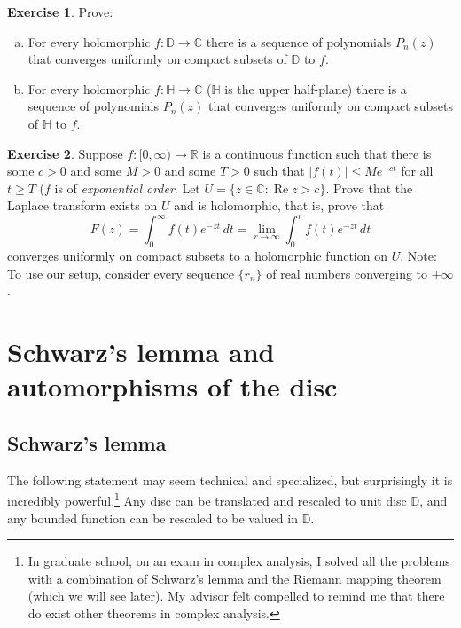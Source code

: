 \documentclass[12pt,openany]{book}
\renewcommand{\Re}{\operatorname{Re}}
\newcommand{\sabs}[1]{\lvert {#1} \rvert}
\newcommand{\C}{{\mathbb{C}}}
\newcommand{\R}{{\mathbb{R}}}
\newcommand{\D}{{\mathbb{D}}}
\newcommand{\bH}{{\mathbb{H}}}
\newcommand{\myindex}[1]{#1\index{#1}}
\theoremstyle{plain}
\theoremstyle{remark}
\theoremstyle{definition}
\newenvironment{exbox}{%
    \def\FrameCommand{\vrule width 1pt \relax\hspace{10pt}}%
    \MakeFramed{\advance\hsize-\width\FrameRestore}%
}{%
    \endMakeFramed
}
\newenvironment{exparts}{%
    \leavevmode\begin{enumerate}[a),noitemsep,topsep=0pt,parsep=0pt,partopsep=0pt]
}{%
    \end{enumerate}
}
\theoremstyle{exercise}
\newtheorem{exercise}{Exercise}[section]
\theoremstyle{example}
\begin{document}
\begin{exbox}
\begin{exercise}\label{exercise:polylimits}
\pagebreak[2]
Prove:
\begin{exparts}
\item
For every holomorphic $f \colon \D \to \C$ there
is a sequence of polynomials $P_n(z)$ that converges uniformly on compact
subsets of $\D$ to $f$.
\item
For every holomorphic $f \colon \bH \to \C$
($\bH$ is the upper half-plane) there
is a sequence of polynomials $P_n(z)$ that converges uniformly on compact
subsets of $\bH$ to $f$.
\end{exparts}
\end{exercise}

\begin{exercise}
\pagebreak[2]
Suppose $f \colon [0,\infty) \to \R$ is a continuous function such that
there is some $c > 0$ and some $M > 0$ and some $T > 0$ such that 
$\sabs{f(t)} \leq M e^{-ct}$ for all $t \geq T$ ($f$ is of
\emph{\myindex{exponential order}}.  Let $U = \{ z \in \C : \Re z > c \}$.  Prove that the Laplace transform
exists on $U$ and is holomorphic, that is, prove that
\begin{equation*}
F(z) = \int_0^\infty f(t) e^{-zt} \, dt = \lim_{r \to \infty} \int_0^r f(t)
e^{-zt} \, dt
\end{equation*}
converges uniformly on compact subsets to a holomorphic function on $U$.
Note: To use our setup, consider every sequence $\{ r_n \}$
of real numbers converging to $+\infty$.
\end{exercise}
\end{exbox}


\section{Schwarz's lemma and automorphisms of the disc}
\label{sec:schwarz}

\subsection{Schwarz's lemma}

The following statement may
seem technical and specialized, but surprisingly it is incredibly
powerful.\footnote{In graduate school, on an exam in complex
analysis, I solved all the problems with a combination of
Schwarz's lemma and the Riemann
mapping theorem (which we will see later).
My advisor
felt compelled to remind me that there do exist other theorems in complex
analysis.}
Any disc can be translated and rescaled to unit disc $\D$, and any
bounded function can be rescaled to be valued in $\D$.
\end{document}
